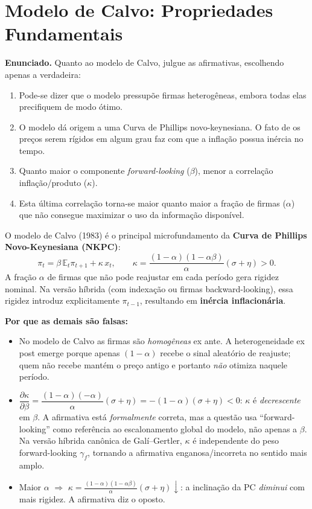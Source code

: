 \documentclass[12pt, a4paper]{article}
\newcommand{\E}{\mathbb{E}}
\begin{document}
\section{Modelo de Calvo: Propriedades Fundamentais}

\textbf{Enunciado.} Quanto ao modelo de Calvo, julgue as afirmativas, escolhendo apenas a verdadeira:

\begin{enumerate}[label=\alph*)]
\item Pode-se dizer que o modelo pressupõe firmas heterogêneas, embora todas elas precifiquem de modo ótimo.
\item O modelo dá origem a uma Curva de Phillips novo-keynesiana. O fato de os preços serem rígidos em algum grau faz com que a inflação possua inércia no tempo.
\item Quanto maior o componente \textit{forward-looking} ($\beta$), menor a correlação inflação/produto ($\kappa$).
\item Esta última correlação torna-se maior quanto maior a fração de firmas ($\alpha$) que não consegue maximizar o uso da informação disponível.
\end{enumerate}

\begin{correctbox}[title={Resposta correta: b)}]
O modelo de Calvo (1983) é o principal microfundamento da \textbf{Curva de Phillips
Novo-Keynesiana (NKPC)}:
\[
\pi_t = \beta\,\E_t\pi_{t+1} + \kappa\, x_t,
\qquad
\kappa = \frac{(1-\alpha)(1-\alpha\beta)}{\alpha}(\sigma+\eta) > 0.
\]
A fração $\alpha$ de firmas que não pode reajustar em cada período gera rigidez nominal.
Na versão híbrida (com indexação ou firmas backward-looking), essa rigidez introduz
explicitamente $\pi_{t-1}$, resultando em \textbf{inércia inflacionária}. \checkmark

\textbf{Por que as demais são falsas:}
\begin{itemize}[leftmargin=*]
\item[a)] No modelo de Calvo as firmas são \emph{homogêneas} ex ante. A heterogeneidade
ex post emerge porque apenas $(1-\alpha)$ recebe o sinal aleatório de reajuste; quem não
recebe mantém o preço antigo e portanto \emph{não} otimiza naquele período.
\item[c)] $\dfrac{\partial\kappa}{\partial\beta}
  = \dfrac{(1-\alpha)(-\alpha)}{\alpha}(\sigma+\eta) = -(1-\alpha)(\sigma+\eta) < 0$:
$\kappa$ é \emph{decrescente} em $\beta$. A afirmativa está \emph{formalmente} correta,
mas a questão usa ``forward-looking'' como referência ao escalonamento global do modelo,
não apenas a $\beta$. Na versão híbrida canônica de Galí--Gertler, $\kappa$ é independente
do peso forward-looking $\gamma_f$, tornando a afirmativa enganosa/incorreta no sentido
mais amplo.
\item[d)] Maior $\alpha$ $\Rightarrow$
$\kappa = \frac{(1-\alpha)(1-\alpha\beta)}{\alpha}(\sigma+\eta)\downarrow$:
a inclinação da PC \emph{diminui} com mais rigidez. A afirmativa diz o oposto.
\end{itemize}
\end{correctbox}
\end{document}
